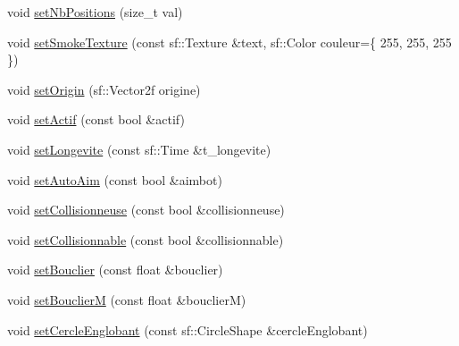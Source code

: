 \begin{DoxyCompactItemize}
\item 
void \mbox{\hyperlink{class_entite_af36fc425e2043216b8519ab0c42f640b}{set\+Nb\+Positions}} (size\+\_\+t val)
\item 
void \mbox{\hyperlink{class_entite_a8cf9eefe7401a127d7692ca379528050}{set\+Smoke\+Texture}} (const sf\+::\+Texture \&text, sf\+::\+Color couleur=\{ 255, 255, 255 \})
\item 
void \mbox{\hyperlink{class_entite_a9c96cb18e7dafa69117d5573ab47de1e}{set\+Origin}} (sf\+::\+Vector2f origine)
\item 
void \mbox{\hyperlink{class_entite_a7b8614d3a7ed5f56ac295e34845310b7}{set\+Actif}} (const bool \&actif)
\item 
void \mbox{\hyperlink{class_entite_a1bf4d7561c3aa7f60d5af962a5a7e920}{set\+Longevite}} (const sf\+::\+Time \&t\+\_\+longevite)
\item 
void \mbox{\hyperlink{class_entite_a41a766786a95ec14c36483b3c0934e12}{set\+Auto\+Aim}} (const bool \&aimbot)
\item 
void \mbox{\hyperlink{class_entite_afb20773e78fd021d737d9f69e347372f}{set\+Collisionneuse}} (const bool \&collisionneuse)
\item 
void \mbox{\hyperlink{class_entite_acc07f9acea55b0a93b99f2ed57fef772}{set\+Collisionnable}} (const bool \&collisionnable)
\item 
void \mbox{\hyperlink{class_entite_a32e937b33745db139fae2e24b2587890}{set\+Bouclier}} (const float \&bouclier)
\item 
void \mbox{\hyperlink{class_entite_a0d6411b7a94d911d8adb0d4e08c3741c}{set\+BouclierM}} (const float \&bouclierM)
\item 
void \mbox{\hyperlink{class_entite_a88effd77e4276064031a02f5755cc321}{set\+Cercle\+Englobant}} (const sf\+::\+Circle\+Shape \&cercle\+Englobant)
\end{DoxyCompactItemize}
